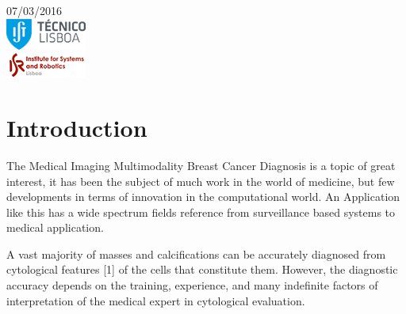 \begin{titlepage}


{\large 07/03/2016}\\[1cm] %


\includegraphics{ist-logo.png}\\[0.5cm] %

\includegraphics{isr-logo.png}\\[0.5cm] %
 

\vfill %

\end{titlepage}

\section{Introduction}

The Medical Imaging Multimodality Breast Cancer Diagnosis is a topic of great interest, it has been the subject of much work in the world of medicine, but few developments in terms of innovation in the computational world. An Application like this has a wide spectrum fields reference from surveillance based systems to medical application.

A vast majority of masses and calcifications can be accurately diagnosed from cytological features [1] of the cells that constitute them. However, the diagnostic accuracy depends on the training, experience, and many indefinite factors of interpretation of the medical expert in cytological evaluation.

